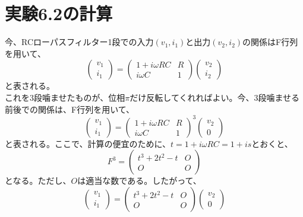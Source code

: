 \documentclass[a4paper,11pt]{jsarticle}
\numberwithin{equation}{section}
\begin{document}
\section{実験6.2の計算}
今、RCローパスフィルター1段での入力$(v_1,i_1)$と出力$(v_2,i_2)$の関係はF行列を用いて、
\begin{equation}
  \begin{pmatrix}
    v_1\\
    i_1
  \end{pmatrix}
  =
  \begin{pmatrix}
    1+i\omega RC & R\\
    i\omega C & 1
  \end{pmatrix}
  \begin{pmatrix}
    v_2\\
    i_2
  \end{pmatrix}
\end{equation}
と表される。\\
これを3段噛ませたものが、位相$\pi$だけ反転してくれればよい。今、3段噛ませる前後での関係は、F行列を用いて、
\begin{equation}
  \begin{pmatrix}
    v_1\\
    i_1
  \end{pmatrix}
  =
  \begin{pmatrix}
    1+i\omega RC & R\\
    i\omega C & 1
  \end{pmatrix}^3
  \begin{pmatrix}
    v_2\\
    0
  \end{pmatrix}
\end{equation}
と表される。ここで、計算の便宜のために、$t =1+i\omega RC = 1+is$とおくと、
\begin{equation}
  F^3 =
  \begin{pmatrix}
    t^3+2t^2-t & O\\
    O & O
  \end{pmatrix}
\end{equation}
となる。ただし、$O$は適当な数である。したがって、
\begin{equation}
  \begin{pmatrix}
    v_1\\
    i_1
  \end{pmatrix}
  =
  \begin{pmatrix}
    t^3+2t^2-t & O\\
    O & O
  \end{pmatrix}
  \begin{pmatrix}
    v_2\\
    0
  \end{pmatrix}
\end{equation}
\end{document}
